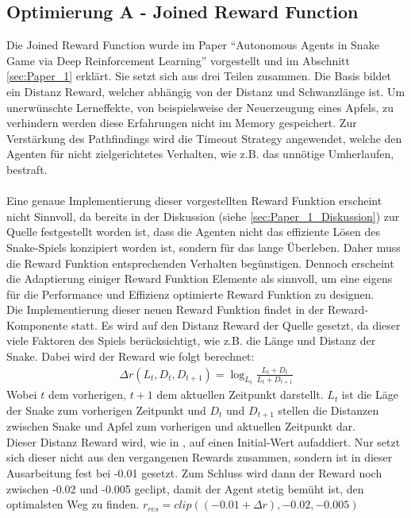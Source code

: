 \subsection{Optimierung A - Joined Reward Function} \label{sec:Konzept_Optimierung01}
Die Joined Reward Function wurde im Paper "`Autonomous Agents in Snake Game via Deep Reinforcement Learning"' \cite{Autonomous_Agents_in_Snake_Game_via_DRL} vorgestellt und im Abschnitt \ref{sec:Paper_1} erklärt. Sie setzt sich aus drei Teilen zusammen. Die Basis bildet ein Distanz Reward, welcher abhängig von der Distanz und Schwanzlänge ist. Um unerwünschte Lerneffekte, von beispielsweise der Neuerzeugung eines Apfels, zu verhindern werden diese Erfahrungen nicht im Memory gespeichert. Zur Verstärkung des Pathfindings wird die Timeout Strategy angewendet, welche den Agenten für nicht zielgerichtetes Verhalten, wie z.B. das unnötige Umherlaufen, bestraft.\\
\\Eine genaue Implementierung dieser vorgestellten Reward Funktion erscheint nicht Sinnvoll, da bereits in der Diskussion (siehe \ref{sec:Paper_1_Diskussion}) zur Quelle \cite{Autonomous_Agents_in_Snake_Game_via_DRL} festgestellt worden ist, dass die Agenten nicht das effiziente Lösen des Snake-Spiels konzipiert worden ist, sondern für das lange Überleben. Daher muss die Reward Funktion entsprechenden Verhalten begünstigen. Dennoch erscheint die Adaptierung einiger Reward Funktion Elemente als sinnvoll, um eine eigens für die Performance und Effizienz optimierte Reward Funktion zu designen.\\
Die Implementierung dieser neuen Reward Funktion findet in der Reward-Komponente statt. 
Es wird auf den Distanz Reward der Quelle \cite{Autonomous_Agents_in_Snake_Game_via_DRL} gesetzt, da dieser viele Faktoren des Spiels berücksichtigt, wie z.B. die Länge und Distanz der Snake. Dabei wird der Reward wie folgt berechnet:
\begin{align}
	\Delta r(L_t, D_t,D_{t+1}) = \log_{L_t}\frac{L_t + D_t}{L_t + D_{t + 1}}
\end{align}
Wobei $t$ dem vorherigen, $t+1$ dem aktuellen Zeitpunkt darstellt. $L_t$ ist die Läge der Snake zum vorherigen Zeitpunkt und $D_t$ und $D_{t+1}$ stellen die Distanzen zwischen Snake und Apfel zum vorherigen und aktuellen Zeitpunkt dar.\\
Dieser Distanz Reward wird, wie in \cite{Autonomous_Agents_in_Snake_Game_via_DRL}, auf einen Initial-Wert aufaddiert. Nur setzt sich dieser nicht aus den vergangenen Rewards zusammen, sondern ist in dieser Ausarbeitung fest bei -0.01 gesetzt. Zum Schluss wird dann der Reward noch zwischen -0.02 und -0.005 geclipt, damit der Agent stetig bemüht ist, den optimalsten Weg zu finden.
$r_{res} = clip((-0.01 + \Delta r), -0.02, -0.005)$

